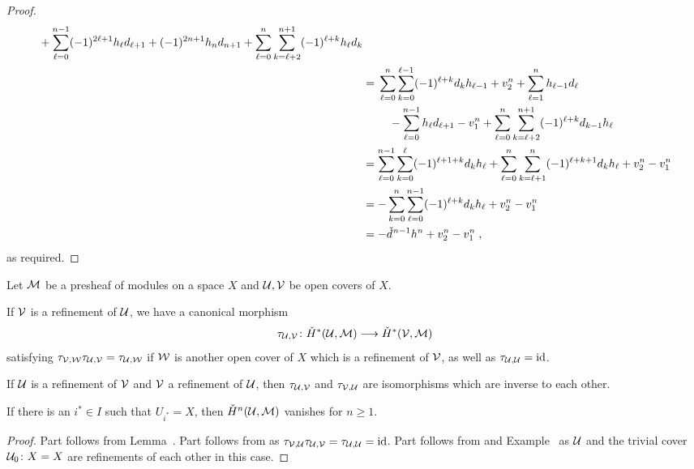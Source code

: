 \documentclass[a4paper,parskip=half,numbers=enddot, DIV=12]{scrreprt}
\begin{document}
\begin{proof}
\begin{align*}
\begin{multlined}[t]
			+\sum_{\ell=0}^{n-1}(-1)^{2\ell+1}h_\ell d_{\ell+1}+(-1)^{2n+1}h_nd_{n+1}+\sum_{\ell=0}^{n}\sum_{k=\ell+2}^{n+1}(-1)^{\ell+k}h_\ell d_k
		\end{multlined}\\
		&=\begin{multlined}[t]
			\sum_{\ell=0}^{n}\sum_{k=0}^{\ell-1}(-1)^{\ell+k}d_k h_{\ell-1}+v_2^n+\sum_{\ell=1}^{n}h_{\ell-1} d_\ell\\
			-\sum_{\ell=0}^{n-1}h_\ell d_{\ell+1}-v_1^n+\sum_{\ell=0}^{n}\sum_{k=\ell+2}^{n+1}(-1)^{\ell+k}d_{k-1} h_{\ell}
		\end{multlined}\\
		&=\sum_{\ell=0}^{n-1}\sum_{k=0}^{\ell}(-1)^{\ell+1+k}d_k h_{\ell}+\sum_{\ell=0}^{n}\sum_{k=\ell+1}^{n}(-1)^{\ell+k+1}d_{k} h_{\ell}+v_2^n-v_1^n\\
		&=-\sum_{k=0}^{n}\sum_{\ell=0}^{n-1}(-1)^{\ell+k}d_kh_\ell +v_2^n-v_1^n\\
		&=-\hacek{d}^{n-1}h^n+v_2^n-v_1^n\;,
	\end{align*}
	as required.
\end{proof}
\begin{cor}
	Let $\mathcal{M}$ be a presheaf of modules on a space $X$ and $\mathcal{U},\mathcal{V}$ be open covers of $X$.
	\begin{alphanumerate} 
		\item If $\mathcal{V}$ is a refinement of $\mathcal{U}$, we have a canonical morphism 
		\begin{align*}
			\tau_{\Uu,\Vv}\colon \check{H}^*(\Uu,\Mm)\morphism\check{H}^*(\Vv,\Mm)
		\end{align*}
		satisfying $\tau_{\mathcal{V},\mathcal{W}}\tau_{\mathcal{U},\mathcal{V}}=\tau_{\mathcal{U},\mathcal{W}}$ if $\mathcal{W}$ is another open cover of $X$ which is a refinement of $\mathcal{V}$, as well as $\tau_{\mathcal{U},\mathcal{U}}=\operatorname{id}$.
		\item If $\mathcal{U}$ is a refinement of $\mathcal{V}$ and $\mathcal{V}$ a refinement of $\mathcal{U}$, then $\tau_{\mathcal{U},\mathcal{V}}$ and $\tau_{\mathcal{V},\mathcal{U}}$ are isomorphisms which are inverse to each other.
		\item If there is an $i^*\in I$ such that $U_{i^*}=X$, then $\check{H}^n(\mathcal{U},\mathcal{M})$ vanishes for $n\geq 1$.
	\end{alphanumerate}
\end{cor}
\begin{proof}
	Part  follows from Lemma~. Part  follows from  as $\tau_{\mathcal{V},\mathcal{U}}\tau_{\mathcal{U},\mathcal{V}}=\tau_{\mathcal{U},\mathcal{U}}=\operatorname{id}$. Part  follows from  and Example~ as $\mathcal{U}$ and the trivial cover $\mathcal{U}_0\colon X=X$ are refinements of each other in this case.
\end{proof}
\end{document}
